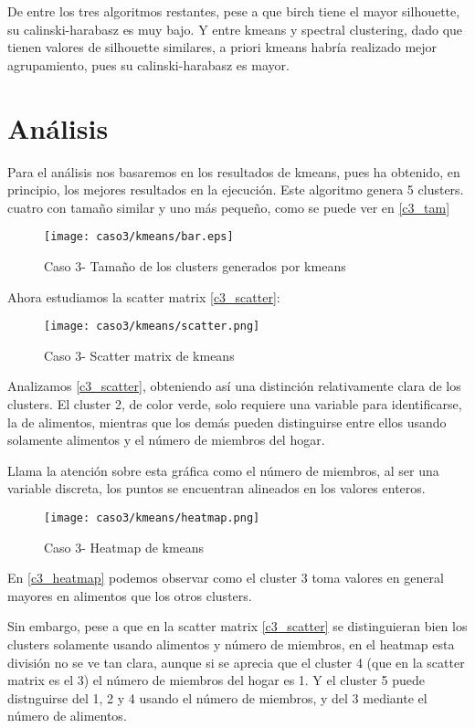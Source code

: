 De entre los tres algoritmos restantes, pese a que birch tiene el mayor silhouette, su calinski-harabasz es muy bajo. Y entre kmeans y spectral clustering, dado que tienen valores de silhouette similares, a priori kmeans habría realizado mejor agrupamiento, pues su calinski-harabasz es mayor.


\section{Análisis}


Para el análisis nos basaremos en los resultados de kmeans, pues ha obtenido, en principio, los mejores resultados en la ejecución. Este algoritmo genera 5 clusters. cuatro con tamaño similar y uno más pequeño, como se puede ver en \eqref{c3_tam}

\begin{figure}[H]
\caption{Caso 3- Tamaño de los clusters generados por kmeans}
\label{c3_tam}
\texttt{[image: caso3/kmeans/bar.eps]}
\end{figure}

Ahora estudiamos la scatter matrix \eqref{c3_scatter}:

\begin{figure}[H]
\caption{Caso 3- Scatter matrix de kmeans}
\label{c3_scatter}
\texttt{[image: caso3/kmeans/scatter.png]}
\end{figure}

Analizamos \eqref{c3_scatter}, obteniendo así una distinción relativamente clara de los clusters. El cluster 2, de color verde, solo requiere una variable para identificarse, la de alimentos, mientras que los demás pueden distinguirse entre ellos usando solamente alimentos y el número de miembros del hogar.

Llama la atención sobre esta gráfica como el número de miembros, al ser una variable discreta, los puntos se encuentran alineados en los valores enteros.

\begin{figure}[H]
\caption{Caso 3- Heatmap de kmeans}
\label{c3_heatmap}
\texttt{[image: caso3/kmeans/heatmap.png]}
\end{figure}

En \eqref{c3_heatmap} podemos observar como el cluster 3 toma valores en general mayores en alimentos que los otros clusters.

Sin embargo, pese a que en la scatter matrix \eqref{c3_scatter} se distinguieran bien los clusters solamente usando alimentos y número de miembros, en el heatmap esta división no se ve tan clara, aunque si se aprecia que el cluster 4 (que en la scatter matrix es el 3) el número de miembros del hogar es 1. Y el cluster 5 puede distnguirse del 1, 2 y 4 usando el número de miembros, y del 3 mediante el número de alimentos.



